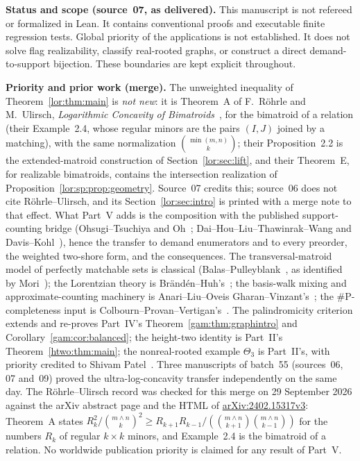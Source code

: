\documentclass[11pt]{article}
\numberwithin{equation}{section}
\theoremstyle{definition}
\newcommand{\arxiv}[1]{\href{https://arxiv.org/abs/#1}{arXiv:#1}}
\begin{document}
\begin{statusbox}
\small\textbf{Status and scope (source~07, as delivered).}
This manuscript is not refereed or formalized in Lean.
It contains conventional proofs and executable finite regression tests. Global
priority of the applications is not established. It does not solve flag
realizability, classify real-rooted graphs, or construct a direct demand-to-support
bijection. These boundaries are kept explicit throughout.
\end{statusbox}

\begin{statusbox}
\small\textbf{Priority and prior work (merge).} The unweighted inequality
of Theorem~\ref{lor:thm:main} is \emph{not new}: it is Theorem~A of
F.~R\"ohrle and M.~Ulirsch, \emph{Logarithmic Concavity of
Bimatroids}~\cite{RU}, for the bimatroid of a relation (their
Example~2.4, whose regular minors are the pairs $(I,J)$ joined by a
matching), with the same normalization $\binom{\min(m,n)}k$; their
Proposition~2.2 is the extended-matroid construction of
Section~\ref{lor:sec:lift}, and their Theorem~E, for realizable bimatroids,
contains the intersection realization of
Proposition~\ref{lor:sp:prop:geometry}. Source~07 credits this; source~06
does not cite R\"ohrle--Ulirsch, and its Section~\ref{lor:sec:intro} is
printed with a merge note to that effect. What Part~V adds is the
composition with the published support-counting bridge (Ohsugi--Tsuchiya
and Oh~\cite{OT20,Oh}; Dai--Hou--Liu--Thawinrak--Wang and
Davis--Kohl~\cite{DHLTW,DK}), hence the transfer to demand enumerators and
to every preorder, the weighted two-shore form, and the consequences. The
transversal-matroid model of perfectly matchable sets is classical
(Balas--Pulleyblank~\cite{BP}, as identified by Mori~\cite{Mori}); the
Lorentzian theory is Br\"and\'en--Huh's~\cite{BH}; the basis-walk mixing and
approximate-counting machinery is Anari--Liu--Oveis Gharan--Vinzant's~\cite{ALOV};
the $\#\mathrm P$-completeness input is Colbourn--Provan--Vertigan's~\cite{CPV}.
The palindromicity criterion extends and re-proves Part~IV's
Theorem~\ref{gam:thm:graphintro} and Corollary~\ref{gam:cor:balanced}; the
height-two identity is Part~II's Theorem~\ref{htwo:thm:main}; the
nonreal-rooted example $\Theta_3$ is Part~II's, with priority credited to
Shivam Patel~\cite{Patel}. Three manuscripts of batch~55 (sources~06, 07
and~09) proved the ultra-log-concavity transfer independently on the same
day. The Röhrle--Ulirsch record was checked for this merge on
29 September 2026 against the arXiv abstract page and the HTML of
\arxiv{2402.15317v3}: Theorem~A states
$R_k^2/\binom{m\wedge n}k^2\ge R_{k+1}R_{k-1}/(\binom{m\wedge n}{k+1}\binom{m\wedge n}{k-1})$
for the numbers $R_k$ of regular $k\times k$ minors, and Example~2.4 is the
bimatroid of a relation. No worldwide publication priority is claimed for
any result of Part~V.
\end{statusbox}
\end{document}
